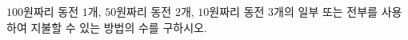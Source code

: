 \hspace*{2mm}\begin{minipage}[t]{\dimexpr\linewidth-2mm\relax}\vspace{0pt}
$100$원짜리 동전 $1$개, $50$원짜리 동전 $2$개, $10$원짜리 동전 $3$개의 일부 또는 전부를 사용하여 지불할 수 있는 방법의 수를 구하시오. \end{minipage}
